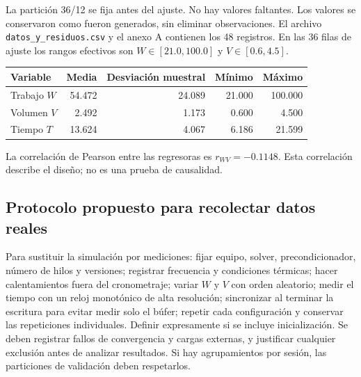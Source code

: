 \documentclass[11pt,a4paper]{article}
\begin{document}
La partición 36/12 se fija antes del ajuste. No hay valores faltantes. Los valores se conservaron como fueron generados, sin eliminar observaciones. El archivo \texttt{datos\_y\_residuos.csv} y el anexo A contienen los 48 registros. En las 36 filas de ajuste los rangos efectivos son $W\in[21.0,100.0]$ y $V\in[0.6,4.5]$.
\begin{center}
\begin{tabular}{lrrrr}\toprule
Variable & Media & Desviación muestral & Mínimo & Máximo\\\midrule
Trabajo $W$ & 54.472 & 24.089 & 21.000 & 100.000\\
Volumen $V$ & 2.492 & 1.173 & 0.600 & 4.500\\
Tiempo $T$ & 13.624 & 4.067 & 6.186 & 21.599\\
\bottomrule\end{tabular}
\end{center}
La correlación de Pearson entre las regresoras es $r_{WV}=-0.1148$. Esta correlación describe el diseño; no es una prueba de causalidad.

\subsection{Protocolo propuesto para recolectar datos reales}
Para sustituir la simulación por mediciones: fijar equipo, solver, precondicionador, número de hilos y versiones; registrar frecuencia y condiciones térmicas; hacer calentamientos fuera del cronometraje; variar $W$ y $V$ con orden aleatorio; medir el tiempo con un reloj monotónico de alta resolución; sincronizar al terminar la escritura para evitar medir solo el búfer; repetir cada configuración y conservar las repeticiones individuales. Definir expresamente si se incluye inicialización. Se deben registrar fallos de convergencia y cargas externas, y justificar cualquier exclusión antes de analizar resultados. Si hay agrupamientos por sesión, las particiones de validación deben respetarlos.
\end{document}

